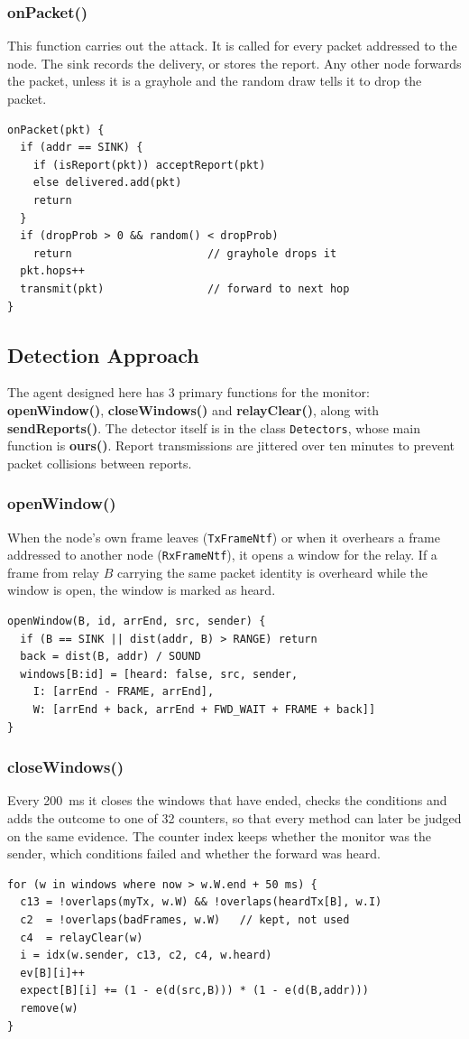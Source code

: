 \documentclass[conference]{IEEEtran}
\begin{document}
\subsubsection{onPacket()}
This function carries out the attack. It is called for every packet addressed to the node. The sink records the delivery, or stores the report. Any other node forwards the packet, unless it is a grayhole and the random draw tells it to drop the packet.
\begin{lstlisting}
onPacket(pkt) {
  if (addr == SINK) {
    if (isReport(pkt)) acceptReport(pkt)
    else delivered.add(pkt)
    return
  }
  if (dropProb > 0 && random() < dropProb)
    return                     // grayhole drops it
  pkt.hops++
  transmit(pkt)                // forward to next hop
}
\end{lstlisting}

\subsection{Detection Approach}
The agent designed here has 3 primary functions for the monitor: \textbf{openWindow()}, \textbf{closeWindows()} and \textbf{relayClear()}, along with \textbf{sendReports()}. The detector itself is in the class \texttt{Detectors}, whose main function is \textbf{ours()}. Report transmissions are jittered over ten minutes to prevent packet collisions between reports.

\subsubsection{openWindow()}
When the node's own frame leaves (\texttt{TxFrameNtf}) or when it overhears a frame addressed to another node (\texttt{RxFrameNtf}), it opens a window for the relay. If a frame from relay $B$ carrying the same packet identity is overheard while the window is open, the window is marked as heard.
\begin{lstlisting}
openWindow(B, id, arrEnd, src, sender) {
  if (B == SINK || dist(addr, B) > RANGE) return
  back = dist(B, addr) / SOUND
  windows[B:id] = [heard: false, src, sender,
    I: [arrEnd - FRAME, arrEnd],
    W: [arrEnd + back, arrEnd + FWD_WAIT + FRAME + back]]
}
\end{lstlisting}

\subsubsection{closeWindows()}
Every 200~ms it closes the windows that have ended, checks the conditions and adds the outcome to one of 32 counters, so that every method can later be judged on the same evidence. The counter index keeps whether the monitor was the sender, which conditions failed and whether the forward was heard.
\begin{lstlisting}
for (w in windows where now > w.W.end + 50 ms) {
  c13 = !overlaps(myTx, w.W) && !overlaps(heardTx[B], w.I)
  c2  = !overlaps(badFrames, w.W)   // kept, not used
  c4  = relayClear(w)
  i = idx(w.sender, c13, c2, c4, w.heard)
  ev[B][i]++
  expect[B][i] += (1 - e(d(src,B))) * (1 - e(d(B,addr)))
  remove(w)
}
\end{lstlisting}
\end{document}
